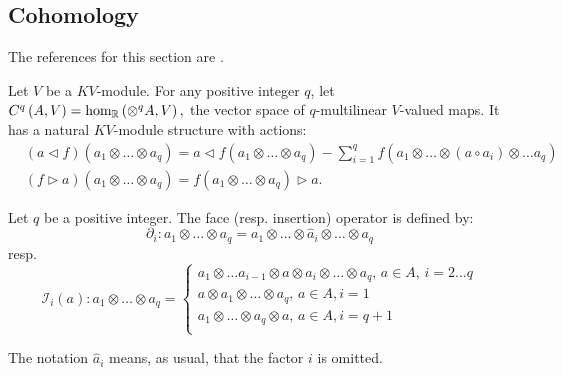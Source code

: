 \subsection{Cohomology}
The references for this section are \cite{Boyom2002,Dzhumadil1999}. 
\begin{defn}
    \label{def:kv_complex}
    Let $V$ be a $KV$-module. For any positive integer $q$, let $C^q\left( A, V \right) = \hom_{\mathbb{R}}\left( \otimes^q A, V \right),$ the vector space of $q$-multilinear $V$-valued maps.
    It has a natural $KV$-module structure with actions:
    \begin{equation}
        \label{eq:kv_cq}
        \begin{split}
            & \left( a \triangleleft f \right)\left( a_1 \otimes \dots \otimes a_q \right) = a \triangleleft f\left( a_1 \otimes \dots \otimes a_q \right) - \sum_{i=1}^q f\left( 
                a_1 \otimes \dots \otimes \left(a \circ a_i\right) \otimes \dots a_q
             \right) \\
             & \left( f \triangleright a \right)\left( a_1 \otimes \dots \otimes a_q \right) = f\left( a_1 \otimes \dots \otimes a_q \right) \triangleright a.
        \end{split}
    \end{equation}
\end{defn}
\begin{defn}
\label{def:kv_face_insert}
Let $q$ be a positive integer. The face (resp. insertion) operator is defined by:
\begin{equation}
    \label{eq:kv_face}
    \partial_i \colon a_1 \otimes \dots \otimes a_q = a_1 \otimes \dots \otimes \hat{a}_i \otimes \dots \otimes a_q
\end{equation}
resp.
\begin{equation}
    \label{eq:kv_insert}
    \mathcal{I}_i(a) \colon a_1 \otimes \dots \otimes a_q = 
    \begin{cases}
        a_1 \otimes \dots  a_{i-1} \otimes a \otimes a_i \otimes \dots \otimes a_q, \, a \in A, \, i=2 \dots q\\
        a \otimes a_1 \otimes \dots \otimes a_q, \, a \in A, i=1 \\
        a_1 \otimes \dots \otimes a_q \otimes a, \, a \in A, i=q+1 \\
    \end{cases}
\end{equation}
\end{defn}
\begin{rem}
    The notation $\hat{a}_i$ means, as usual, that the factor $i$ is omitted. 
\end{rem}
